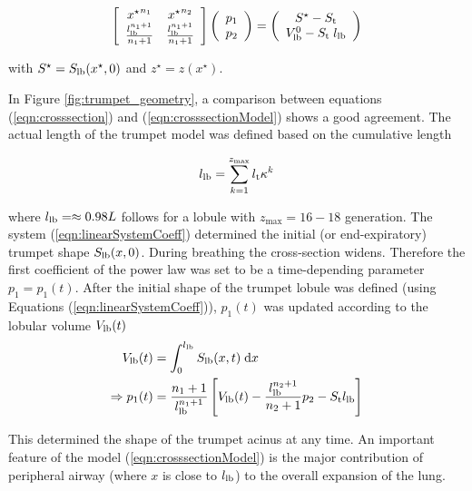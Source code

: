 \begin{equation} \label{eqn:linearSystemCoeff}
\left[\begin{array}{c c} {x^\star}^{n_1}              & {x^\star}^{n_2} \\
                         \frac{l_{\mathrm{lb}}^{n_1+1}}{n_1 + 1} & \frac{l_{\mathrm{lb}}^{n_1+1}}{n_1 + 1} \\
      \end{array}\right]
\left(\begin{array}{c} p_1 \\
                       p_2 \\
      \end{array}\right)
=
\left(\begin{array}{c} S^\star - S_{\mathrm{t}} \\
                       V_\mathrm{lb}^0 - S_{\mathrm{t}}\;l_{\mathrm{lb}}\\
      \end{array}\right)
\end{equation}

with $S^\star = S_{\mathrm{lb}}(x^\star, 0)$ and $z^\star = z(x^\star)$.

In Figure \ref{fig:trumpet_geometry}, a comparison between equations (\ref{eqn:crosssection}) and (\ref{eqn:crosssectionModel}) shows a good agreement.
The actual length of the trumpet model was defined based on the cumulative length

\begin{equation}
l_{\mathrm{lb}} = \sum_{k=1}^{z_\mathrm{max}} l_{\mathrm{t}}\kappa^k
\end{equation}

where $l_{\mathrm{lb}} = \approx0.98 L$ follows for a lobule with $z_\mathrm{max} = 16-18$ generation.
The system (\ref{eqn:linearSystemCoeff}) determined the initial (or end-expiratory) trumpet shape $S_{\mathrm{lb}}(x,0)$.
During breathing the cross-section widens.
Therefore the first coefficient of the power law was set to be a time-depending parameter $p_1 = p_1(t)$.
After the initial shape of the trumpet lobule was defined (using Equations (\ref{eqn:linearSystemCoeff})), $p_1(t)$ was updated according to the lobular volume $V_{\mathrm{lb}}(t)$
\begin{align}
  V_{\mathrm{lb}}(t) &= \int_0^{l_{\mathrm{lb}}} S_{\mathrm{lb}}(x,t)\;\mathrm{d} x \\
  \Rightarrow p_1(t) &= \frac{n_1+1}{l_{\mathrm{lb}}^{n_1+1}} \left[ V_{\mathrm{lb}}(t) - \frac{l_{\mathrm{lb}}^{n_2+1}}{n_2 + 1} p_2 - S_{\mathrm{t}} l_{\mathrm{lb}}\right] \label{eqn:shapeParameter}
\end{align}

This determined the shape of the trumpet acinus at any time.
An important feature of the model (\ref{eqn:crosssectionModel}) is the major contribution of peripheral airway (where $x$ is close to $l_{\mathrm{lb}}$) to the overall expansion of the lung.


